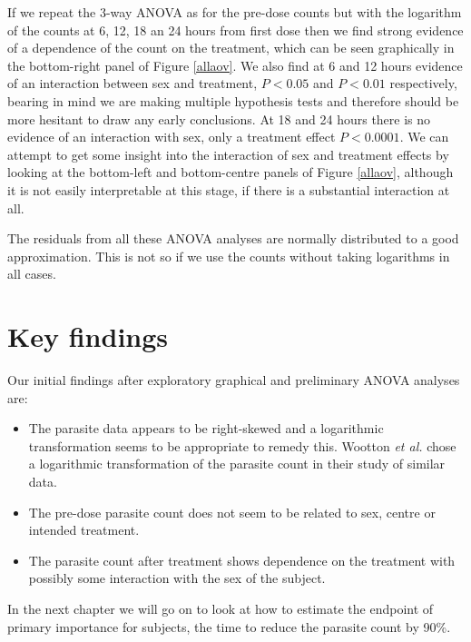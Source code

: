 \pagebreak
If we repeat the 3-way ANOVA as for the pre-dose counts but with the logarithm of the counts at 6, 12, 18 an 24 hours from first dose then we find strong evidence of a dependence of the count on the treatment, which can be seen graphically in the bottom-right panel of Figure \ref{allaov}. We also find at 6 and 12 hours evidence of an interaction between sex and treatment, $P<0.05$ and $P<0.01$ respectively, bearing in mind we are making multiple hypothesis tests and therefore should be more hesitant to draw any early conclusions. At 18 and 24 hours there is no evidence of an interaction with sex, only a treatment effect $P<0.0001$. We can attempt to get some insight into the interaction of sex and treatment effects by looking at the bottom-left and bottom-centre panels of Figure \ref{allaov}, although it is not easily interpretable at this stage, if there is a substantial interaction at all.

The residuals from all these ANOVA analyses are normally distributed to a good approximation. This is not so if we use the counts without taking logarithms in all cases.
\section{Key findings}
Our initial findings after exploratory graphical and preliminary ANOVA analyses are:
\begin{itemize}
\item The parasite data appears to be right-skewed and a logarithmic transformation seems to be appropriate to remedy this. Wootton \textit{et al.}\cite{wootton} chose a logarithmic transformation of the parasite count in their study of similar data.
\item The pre-dose parasite count does not seem to be related to sex, centre or intended treatment.
\item The parasite count after treatment shows dependence on the treatment with possibly some interaction with the sex of the subject.
\end{itemize}

In the next chapter we will go on to look at how to estimate the endpoint of primary importance for subjects, the time to reduce the parasite count by 90\%.